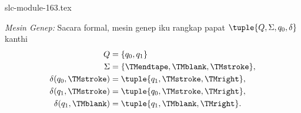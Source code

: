 \begin{filecontents*}[overwrite]{slc-module-163.tex}
\begin{ex}
\emph{Mesin Genep:} Sacara formal,
mesin genep iku rangkap papat
$\tuple{Q, \Sigma, q_0, \delta}$ kanthi
\begin{align*}
Q & = \{ q_0, q_1 \} \\
\Sigma & = \{ \TMendtape, \TMblank, \TMstroke \}, \\
\delta(q_0, \TMstroke) & = \tuple{q_1, \TMstroke, \TMright},\\
\delta(q_1, \TMstroke) & = \tuple{q_0, \TMstroke, \TMright},\\
\delta(q_1, \TMblank)  & = \tuple{q_1, \TMblank, \TMright}.
\end{align*}
\end{ex}


\end{filecontents*}


